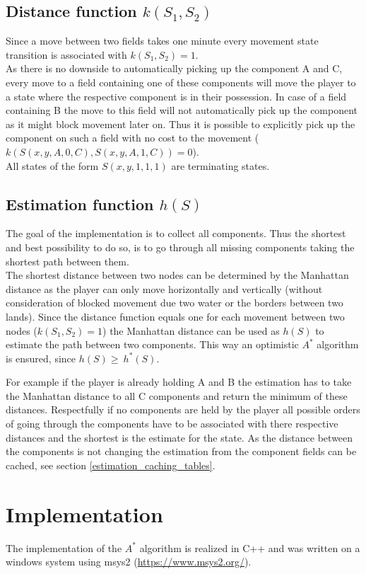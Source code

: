 \documentclass{article}
\begin{document}
\subsection{Distance function  $k(S_1, S_2)$}
Since a move between two fields takes one minute every movement state transition is associated with $k(S_1, S_2) = 1$.\\
As there is no downside to automatically picking up the component A and C, every move to a field containing one of these components will move the player to a state where the respective component is in their possession. In case of a field containing B the move to this field will not automatically pick up the component as it might block movement later on. Thus it is possible to explicitly pick up the component on such a field with no cost to the movement ($k(S(x,y,A,0,C), S(x,y,A,1,C)) = 0$).\\
All states of the form $S(x,y,1,1,1)$ are terminating states.

\subsection{Estimation function $h(S)$}
The goal of the implementation is to collect all components. Thus the shortest and best possibility to do so, is to go through all missing components taking the shortest path between them. \\
The shortest distance between two nodes can be determined by the Manhattan distance as the player can only move horizontally and vertically (without consideration of blocked movement due two water or the borders between two lands). Since the distance function equals one for each movement between two nodes ($k(S_1, S_2) = 1$) the Manhattan distance can be used as $h(S)$ to estimate the path between two components.
This way an optimistic $A^*$ algorithm is ensured, since $h(S) \geq \ h^*(S)$.

 For example if the player is already holding A and B the estimation has to take the Manhattan distance to all C components and return the minimum of these distances. Respectfully if no components are held by the player all possible orders of going through the components have to be associated with there respective distances and the shortest is the estimate for the state. As the distance between the components is not changing the estimation from the component fields can be cached, see section \ref{estimation_caching_tables}. %


\section{Implementation}
The implementation of the $A^*$ algorithm is realized in C++ and was written on a windows system using msys2 (\url{https://www.msys2.org/}).
\end{document}
